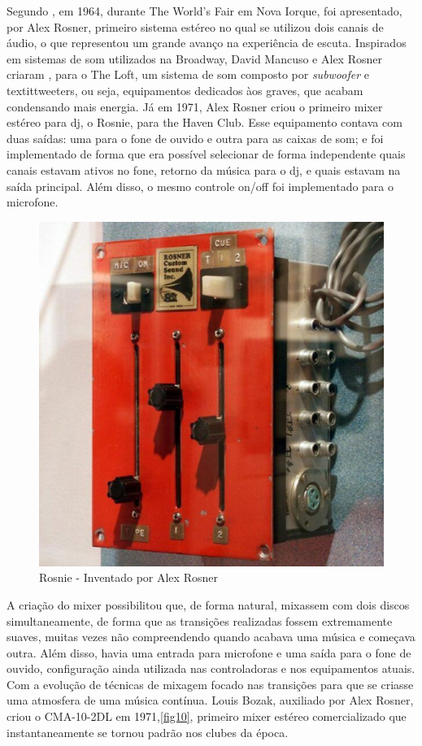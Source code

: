\par
Segundo \cite{lastnight}, em 1964, durante The World's Fair em Nova Iorque, foi apresentado, por Alex Rosner, primeiro sistema estéreo no qual se utilizou dois canais de áudio, o que representou um grande avanço na experiência de escuta. Inspirados em sistemas de som utilizados na Broadway, David Mancuso e Alex Rosner criaram , para o The Loft, um sistema de som composto por \textit{subwoofer} e textit{tweeters}, ou seja, equipamentos dedicados àos graves, que acabam condensando mais energia. Já em 1971, Alex Rosner criou o primeiro mixer estéreo para dj, o Rosnie, para the Haven Club. Esse equipamento contava com duas saídas: uma para o fone de ouvido e outra para as caixas de som; e foi implementado de forma que era possível selecionar de forma independente quais canais estavam ativos no fone, retorno da música para o dj, e quais estavam na saída principal. Além disso, o mesmo controle on/off foi implementado para o microfone. 
\begin{figure}[h]
	\centering
    \includegraphics[scale=0.4]{figuras/fig08.eps}
	\caption{Rosnie - Inventado por Alex Rosner}
	\label{fig08}
\end{figure}
\par
A criação do mixer possibilitou que, de forma natural, mixassem com dois discos simultaneamente, de forma que as transições realizadas fossem extremamente suaves, muitas vezes não compreendendo quando acabava uma música e começava outra. Além disso, havia uma entrada para microfone e uma saída para o fone de ouvido, configuração ainda utilizada nas controladoras e nos equipamentos atuais. Com a evolução de técnicas de mixagem focado nas transições para que se criasse uma atmosfera de uma música contínua.
Louis Bozak, auxiliado por Alex Rosner, criou o CMA-10-2DL em 1971,\ref{fig10}, primeiro mixer estéreo comercializado que instantaneamente se tornou padrão nos clubes da época.

